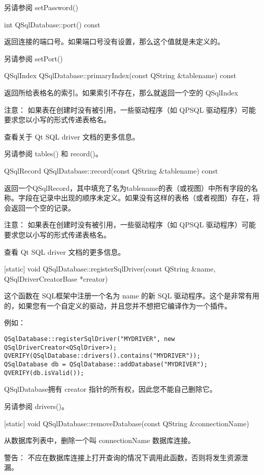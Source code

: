 另请参阅 setPassword()

int QSqlDatabase::port() const


返回连接的端口号。如果端口号没有设置，那么这个值就是未定义的。

另请参阅 setPort()


QSqlIndex QSqlDatabase::primaryIndex(const QString \&tablename) const


返回所给表格名的索引。如果索引不存在，那么就返回一个空的 QSqlIndex

注意： 如果表在创建时没有被引用，一些驱动程序（如 QPSQL 驱动程序）可能要求您以小写的形式传递表格名。

查看关于 Qt SQL driver 文档的更多信息。

另请参阅 tables() 和 record()。

QSqlRecord QSqlDatabase::record(const QString \&tablename) const


返回一个QSqlRecord，其中填充了名为tablename的表（或视图）中所有字段的名称。字段在记录中出现的顺序未定义。如果没有这样的表格（或者视图）存在，将会返回一个空的记录。

注意： 如果表在创建时没有被引用，一些驱动程序（如 QPSQL 驱动程序）可能要求您以小写的形式传递表格名。

查看 Qt SQL driver 文档的更多信息。

[static] void QSqlDatabase::registerSqlDriver(const QString &name, QSqlDriverCreatorBase *creator)


这个函数在 SQL框架中注册一个名为 name 的新 SQL 驱动程序。这个是非常有用的，如果您有一个自定义的驱动，并且您并不想把它编译作为一个插件。

例如：


\begin{lstlisting}
QSqlDatabase::registerSqlDriver("MYDRIVER", new QSqlDriverCreator<QSqlDriver>);
QVERIFY(QSqlDatabase::drivers().contains("MYDRIVER"));
QSqlDatabase db = QSqlDatabase::addDatabase("MYDRIVER");
QVERIFY(db.isValid());
\end{lstlisting}

QSqlDatabase拥有 creator 指针的所有权，因此您不能自己删除它。

另请参阅 drivers()。

[static] void QSqlDatabase::removeDatabase(const QString \&connectionName)


从数据库列表中，删除一个叫 connectionName 数据库连接。

警告： 不应在数据库连接上打开查询的情况下调用此函数，否则将发生资源泄漏。

\clearpage

